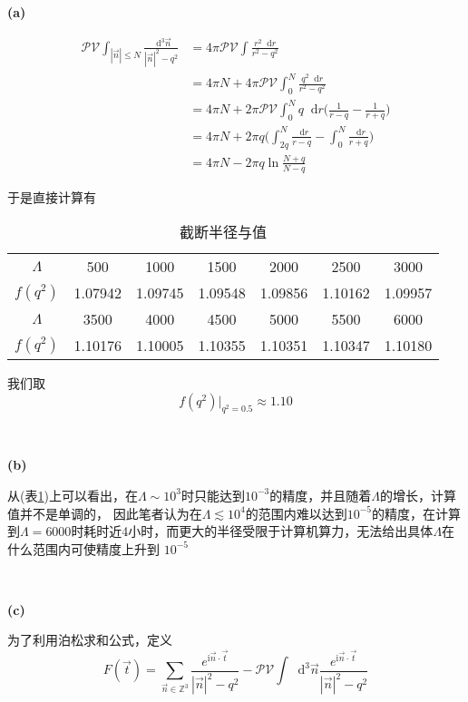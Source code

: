 \documentclass[UTF8]{ctexart}
\newcommand*{\dif}{\mathop{}\!\mathrm{d}}
\begin{document}
\noindent\textbf{(a)}

\begin{equation}\label{4-a-1}
\begin{aligned}
    \mathcal{PV}\int_{|\vec{n}|\leq N}\frac{\dif^3\vec{n}}{|\vec{n}|^2-q^2}&=4\pi\mathcal{PV}\int\frac{r^2\dif r}{r^2-q^2}\\
    &=4\pi N+4\pi\mathcal{PV}\int_0^N \frac{q^2\dif r}{r^2-q^2}\\
    &=4\pi N+2\pi\mathcal{PV}\int_0^Nq\dif r\Big(\frac{1}{r-q}-\frac{1}{r+q}\Big)\\
    &=4\pi N+2\pi q\Big(\int_{2q}^N\frac{\dif r}{r-q}-\int_0^N\frac{\dif r}{r+q}\Big)\\
    &=4\pi N-2\pi q\ln\frac{N+q}{N-q}
\end{aligned}
\end{equation}

于是直接计算有

\begin{table}[H]
    \centering
    \caption{截断半径与值}\label{t2}
    \begin{tabular}{|c|cccccc|}
        \hline
        $\Lambda$ & 500 & 1000 & 1500 & 2000 & 2500 & 3000\\
        $f(q^2)$ & 1.07942 & 1.09745 & 1.09548 & 1.09856 & 1.10162 & 1.09957\\
        \hline
        $\Lambda$ & 3500 & 4000 & 4500 & 5000 & 5500 & 6000\\
        $f(q^2)$ & 1.10176 & 1.10005 & 1.10355 & 1.10351 & 1.10347 & 1.10180\\
        \hline
    \end{tabular}
\end{table}

我们取$$f(q^2)\Big|_{q^2=0.5}\approx 1.10$$

~\

\noindent\textbf{(b)}

从(表\ref{t2})上可以看出，在$\Lambda\sim 10^{3}$时只能达到$10^{-3}$的精度，并且随着$\Lambda$的增长，计算值并不是单调的，
因此笔者认为在$\Lambda\lesssim 10^{4}$的范围内难以达到$10^{-5}$的精度，在计算到$\Lambda=6000$时耗时近4小时，而更大的半径受限于计算机算力，无法给出具体$\Lambda$在什么范围内可使精度上升到
$10^{-5}$

~\

\noindent\textbf{(c)}

为了利用泊松求和公式，定义
$$F(\vec{t})=\sum_{\vec{n}\in\mathbb{Z}^3}\frac{e^{\mathrm{i}\vec{n}\cdot\vec{t}}}{|\vec{n}|^2-q^2}-\mathcal{PV}\int\dif^3\vec{n}\frac{e^{\mathrm{i}\vec{n}\cdot\vec{t}}}{|\vec{n}|^2-q^2}$$
\end{document}
